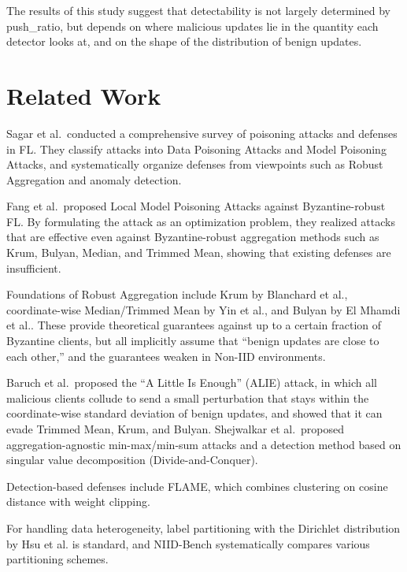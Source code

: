 \documentclass[a4paper,10pt]{article}
\newcommand{\PushRatio}{\textrm{push\_ratio}}
\begin{document}
The results of this study suggest that detectability is not largely determined by \PushRatio{}, but depends on where malicious updates lie in the quantity each detector looks at, and on the shape of the distribution of benign updates.

\section{Related Work}

Sagar et al.\ conducted a comprehensive survey of poisoning attacks and defenses in FL. They classify attacks into Data Poisoning Attacks and Model Poisoning Attacks, and systematically organize defenses from viewpoints such as Robust Aggregation and anomaly detection\cite{sagar2023survey}.

Fang et al.\ proposed Local Model Poisoning Attacks against Byzantine-robust FL. By formulating the attack as an optimization problem, they realized attacks that are effective even against Byzantine-robust aggregation methods such as Krum, Bulyan, Median, and Trimmed Mean, showing that existing defenses are insufficient\cite{fang2020local}.

Foundations of Robust Aggregation include Krum by Blanchard et al.\cite{blanchard2017krum}, coordinate-wise Median/Trimmed Mean by Yin et al.\cite{yin2018byzantine}, and Bulyan by El Mhamdi et al.\cite{elmhamdi2018hidden}. These provide theoretical guarantees against up to a certain fraction of Byzantine clients, but all implicitly assume that ``benign updates are close to each other,'' and the guarantees weaken in Non-IID environments.

Baruch et al.\ proposed the ``A Little Is Enough'' (ALIE) attack, in which all malicious clients collude to send a small perturbation that stays within the coordinate-wise standard deviation of benign updates, and showed that it can evade Trimmed Mean, Krum, and Bulyan\cite{baruch2019little}. Shejwalkar et al.\ proposed aggregation-agnostic min-max/min-sum attacks and a detection method based on singular value decomposition (Divide-and-Conquer)\cite{shejwalkar2021manipulating}.

Detection-based defenses include FLAME\cite{nguyen2022flame}, which combines clustering on cosine distance with weight clipping.

For handling data heterogeneity, label partitioning with the Dirichlet distribution by Hsu et al.\cite{hsu2019measuring} is standard, and NIID-Bench\cite{li2022federated} systematically compares various partitioning schemes.
\end{document}
